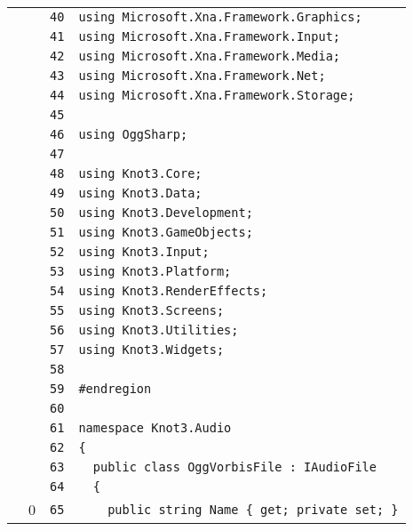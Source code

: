 \documentclass[a4paper,10pt]{article}
\begin{document}
\begin{longtable}[l]{lrrl}
\cellcolor{gray} &  & \verb~40~ & \verb~using Microsoft.Xna.Framework.Graphics;~\\
\cellcolor{gray} &  & \verb~41~ & \verb~using Microsoft.Xna.Framework.Input;~\\
\cellcolor{gray} &  & \verb~42~ & \verb~using Microsoft.Xna.Framework.Media;~\\
\cellcolor{gray} &  & \verb~43~ & \verb~using Microsoft.Xna.Framework.Net;~\\
\cellcolor{gray} &  & \verb~44~ & \verb~using Microsoft.Xna.Framework.Storage;~\\
\cellcolor{gray} &  & \verb~45~ & \verb~~\\
\cellcolor{gray} &  & \verb~46~ & \verb~using OggSharp;~\\
\cellcolor{gray} &  & \verb~47~ & \verb~~\\
\cellcolor{gray} &  & \verb~48~ & \verb~using Knot3.Core;~\\
\cellcolor{gray} &  & \verb~49~ & \verb~using Knot3.Data;~\\
\cellcolor{gray} &  & \verb~50~ & \verb~using Knot3.Development;~\\
\cellcolor{gray} &  & \verb~51~ & \verb~using Knot3.GameObjects;~\\
\cellcolor{gray} &  & \verb~52~ & \verb~using Knot3.Input;~\\
\cellcolor{gray} &  & \verb~53~ & \verb~using Knot3.Platform;~\\
\cellcolor{gray} &  & \verb~54~ & \verb~using Knot3.RenderEffects;~\\
\cellcolor{gray} &  & \verb~55~ & \verb~using Knot3.Screens;~\\
\cellcolor{gray} &  & \verb~56~ & \verb~using Knot3.Utilities;~\\
\cellcolor{gray} &  & \verb~57~ & \verb~using Knot3.Widgets;~\\
\cellcolor{gray} &  & \verb~58~ & \verb~~\\
\cellcolor{gray} &  & \verb~59~ & \verb~#endregion~\\
\cellcolor{gray} &  & \verb~60~ & \verb~~\\
\cellcolor{gray} &  & \verb~61~ & \verb~namespace Knot3.Audio~\\
\cellcolor{gray} &  & \verb~62~ & \verb~{~\\
\cellcolor{gray} &  & \verb~63~ & \verb~  public class OggVorbisFile : IAudioFile~\\
\cellcolor{gray} &  & \verb~64~ & \verb~  {~\\
\cellcolor{red} & 0 & \verb~65~ & \verb~    public string Name { get; private set; }~\\

\end{longtable}
\end{document}
